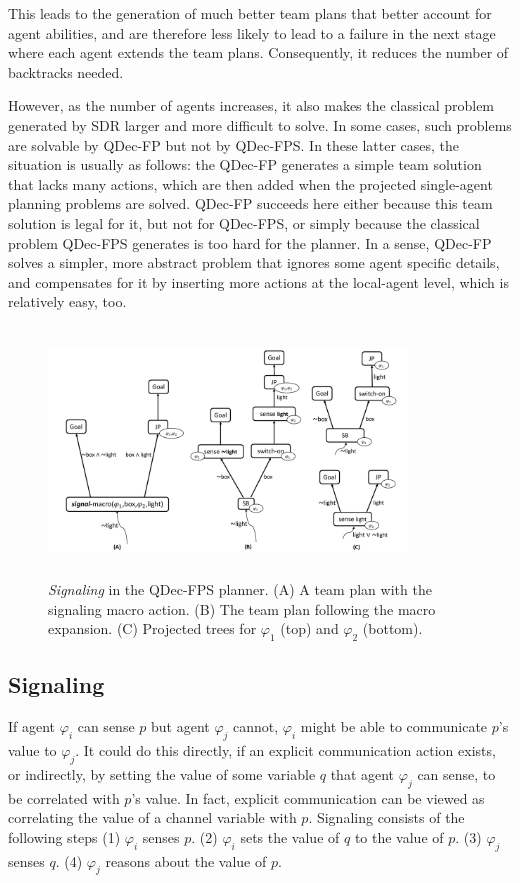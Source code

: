 \documentclass[letterpaper]{article} %
\theoremstyle{definition}
\begin{document}
{This leads to the generation of much better team plans that better account for agent abilities, and are therefore less likely to lead to a failure in the next stage where each agent extends the team plans. Consequently, it reduces the number of backtracks needed. 

However, as the number of agents increases, it also makes the classical problem generated by SDR larger and more difficult to solve.
In some cases, such problems are solvable by QDec-FP
but not by QDec-FPS.
In these latter cases, the situation is usually as follows: the QDec-FP generates a simple team solution that lacks many actions, which are then added when the projected single-agent planning problems are solved.
QDec-FP succeeds here either because this team solution is legal for it, but not for QDec-FPS, or
simply because the classical problem QDec-FPS generates is too hard for the planner.
In a sense, QDec-FP solves a simpler, more abstract problem that ignores some agent specific details, and compensates for it by inserting more actions at the local-agent level, which is relatively easy, too. 
}



\begin{figure}[h!]
\centering
\includegraphics[height=2.6in, width=0.85\textwidth]{signaling-r.pdf}
\caption{
\emph{Signaling} in the QDec-FPS planner. 
(A) A team plan with the signaling macro action.  
(B) The team plan following the macro expansion.
(C) Projected trees for $\varphi_1$ (top) and $\varphi_2$ (bottom).
}
\label{fig:signaling}
\end{figure}
 
\subsection{Signaling}
\label{subsec:signal}
If agent $\varphi_i$ can sense $p$ but agent $\varphi_j$ cannot, $\varphi_i$ might be able to communicate $p$'s value to $\varphi_j$. 
It could do this directly, if an explicit communication action exists, or indirectly, by setting the value of some variable $q$ that agent $\varphi_j$ can sense, to be correlated with $p$'s value. 
In fact, explicit communication can be viewed as correlating the value of a channel variable with $p$.
Signaling consists of the following steps (1) $\varphi_i$ senses $p$. (2) $\varphi_i$ sets the value of $q$ to the value of $p$. (3)  $\varphi_j$ senses $q$. (4) $\varphi_j$ reasons about the value of $p$.  
\end{document}
